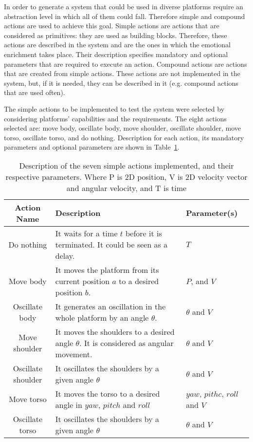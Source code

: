 In order to generate a system that could be used in diverse platforms require an abstraction level in which all of them could fall. Therefore simple and compound actions are used to achieve this goal. Simple actions are actions that are considered as primitives: they are used as building blocks. Therefore, these actions are described in the system and are the ones in which the emotional enrichment takes place. Their description specifies mandatory and optional parameters that are required to execute an action. Compound actions are actions that are created from simple actions. These actions are not implemented in the system, but, if it is needed, they can be described in it (e.g. compound actions that are used often).

The simple actions to be implemented to test the system were selected by considering platforms' capabilities and the requirements. The eight actions selected are: move body, oscillate body, move shoulder, oscillate shoulder, move torso, oscillate torso, and do nothing. Description for each action, its mandatory parameters and optional parameters are shown in Table~\ref{table:actions_implemented}.

\begin{table}
\centering
\caption{Description of the seven simple actions implemented, and their respective parameters. Where  P is 2D position, V is 2D velocity vector and angular velocity, and T is time}
\label{table:actions_implemented}
\begin{tabular}{|c|p{3.9cm}|p{1.4cm}|}
\hline
\textbf{Action Name}& \textbf{Description} &\textbf{Parameter(s)} \\
\hline
Do nothing & It waits for a time $t$ before it is terminated. It could be seen as a delay.  & $T$\\
\hline
Move body & It moves the platform from its current position $a$ to a desired position $b$. & $P$, and $V$\\
\hline
Oscillate body & It generates an oscillation in the whole platform by an angle $\theta$. &  $\theta$ and $V$ \\
\hline
Move shoulder & It moves the shoulders to a desired angle $\theta$. It is considered as angular movement. & $\theta$ and $V$ \\
\hline
Oscillate shoulder & It oscillates the shoulders by a given angle $\theta$ & $\theta$ and $V$\\
\hline
Move torso & It moves the torso to a desired angle in $yaw$, $pitch$ and $roll$& $yaw$, $pithc$, $roll$ and $V$\\
\hline
Oscillate torso & It oscillates the shoulders by a given angle $\theta$ & $\theta$ and $V$\\  
\hline
\end{tabular}
\end{table}

